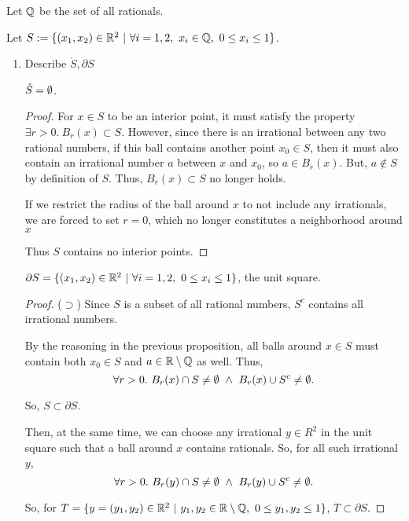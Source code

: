 \documentclass[../hw1]{subfiles}
\begin{document}
\begin{problem}
Let $\mathbb{Q}$ be the set of all rationals.

Let $S:=\{(x_1,x_2)\in \mathbb{R}^{2}\ |\  \forall i = 1,2,\ x_{i} \in \mathbb{Q},\ 0\le x_{i}\le 1\} $.
\begin{enumerate}[label=\alph*)]
	\item Describe $\mathring{S}, \partial S$
	      \begin{proposition}
		      $\mathring S = \emptyset$.
	      \end{proposition}
	      \begin{proof}
		      For $x\in S$ to be an interior point, it must satisfy the property $\exists r>0.\ B_r(x)\subset S$. However, since there is an irrational between any two rational numbers, if this ball contains another point $x_0\in S$, then it must also contain an irrational number $a$ between $x$ and  $x_0$, so $a\in B_r(x)$. But, $a\not\in S$ by definition of $S$. Thus, $B_r(x)\subset S$ no longer holds.

		      If we restrict the radius of the ball around $x$ to not include any irrationals, we are forced to set $r=0$, which no longer constitutes a neighborhood around $x$

		      Thus $S$ contains no interior points.
	      \end{proof}
	      \begin{proposition}
		      $\partial S = \{(x_1,x_2) \in \R^{2}\ |\ \forall i = 1,2,\ 0\le x_{i}\le 1\}$, the unit square.
	      \end{proposition}
	      \begin{proof}
		      ($\supset$)
		      Since $S$ is a subset of all rational numbers, $S^{c}$ contains all irrational numbers.

		      By the reasoning in the previous proposition, all balls around $x\in S$ must contain both $x_0\in S$ and $a\in \mathbb{R}\setminus\mathbb{Q}$ as well. Thus, \[
			      \forall r>0.\ B_r(x)\cap S \neq \O\ \land\ B_r(x)\cup S^{c}\neq\O
			      .\]

		      So, $S\subset \partial S$.

		      Then, at the same time, we can choose any irrational $y\in R^2$ in the unit square such that a ball around $x$ contains rationals. So, for all such irrational $y$,  \[
			      \forall r>0.\ B_r(y)\cap S \neq \O\ \land\ B_r(y)\cup S^{c}\neq\O
			      .\]

		      So, for $T= \{y = (y_1,y_2)\in \R^{2}\ |\ y_1,y_2\in \R\setminus\Q,\ 0\le y_1, y_2\le 1\}$, $T\subset \partial S$.


\end{proof}
\end{enumerate}
\end{problem}
\end{document}
